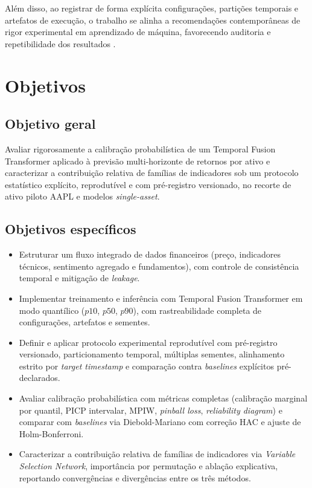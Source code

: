 Além disso, ao registrar de forma explícita configurações, partições temporais e artefatos de execução, o trabalho se alinha a recomendações contemporâneas de rigor experimental em aprendizado de máquina, favorecendo auditoria e repetibilidade dos resultados \cite{PINEAU2021REPRODUCIBILITY}.

\section{Objetivos}
\subsection{Objetivo geral}
Avaliar rigorosamente a calibração probabilística de um Temporal Fusion Transformer aplicado à previsão multi-horizonte de retornos por ativo e caracterizar a contribuição relativa de famílias de indicadores sob um protocolo estatístico explícito, reprodutível e com pré-registro versionado, no recorte de ativo piloto AAPL e modelos \textit{single-asset}.

\subsection{Objetivos específicos}
\begin{itemize}
    \item Estruturar um fluxo integrado de dados financeiros (preço, indicadores técnicos, sentimento agregado e fundamentos), com controle de consistência temporal e mitigação de \textit{leakage}.
    \item Implementar treinamento e inferência com Temporal Fusion Transformer em modo quantílico (\(p10\), \(p50\), \(p90\)), com rastreabilidade completa de configurações, artefatos e sementes.
    \item Definir e aplicar protocolo experimental reprodutível com pré-registro versionado, particionamento temporal, múltiplas sementes, alinhamento estrito por \textit{target timestamp} e comparação contra \textit{baselines} explícitos pré-declarados.
    \item Avaliar calibração probabilística com métricas completas (calibração marginal por quantil, PICP intervalar, MPIW, \textit{pinball loss}, \textit{reliability diagram}) e comparar com \textit{baselines} via Diebold-Mariano com correção HAC e ajuste de Holm-Bonferroni.
    \item Caracterizar a contribuição relativa de famílias de indicadores via \textit{Variable Selection Network}, importância por permutação e ablação explicativa, reportando convergências e divergências entre os três métodos.
\end{itemize}

